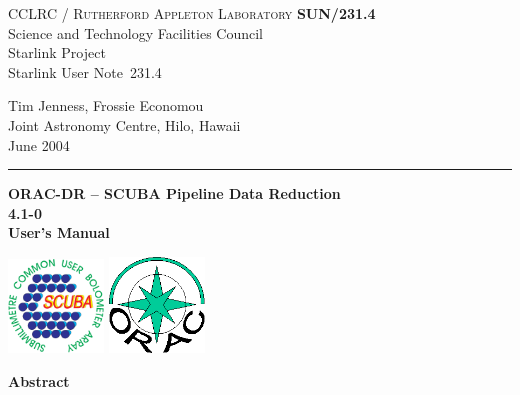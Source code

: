 \documentclass[twoside,11pt]{article}
\newcommand{\stardoccategory}  {Starlink User Note}
\newcommand{\stardocinitials}  {SUN}
\newcommand{\stardocnumber}    {231.4}
\newcommand{\stardocauthors}   {Tim Jenness, Frossie Economou\\
Joint Astronomy Centre, Hilo, Hawaii}
\newcommand{\stardocdate}      {June 2004}
\newcommand{\stardoctitle}     {ORAC-DR -- SCUBA Pipeline Data Reduction}
\newcommand{\stardocversion}   {4.1-0}
\newcommand{\stardocmanual}    {User's Manual}
\newcommand{\stardocname}{\stardocinitials /\stardocnumber}
\newenvironment{latexonly}{}{}
\renewcommand{\_}{\texttt{\symbol{95}}}
\begin{document}
\thispagestyle{empty}

\begin{latexonly}
   CCLRC / \textsc{Rutherford Appleton Laboratory} \hfill \textbf{\stardocname}\\
   {\large Science and Technology Facilities Council}\\
   {\large Starlink Project\\}
   {\large \stardoccategory\ \stardocnumber}
   \begin{flushright}
   \stardocauthors\\
   \stardocdate
   \end{flushright}
   \vspace{-4mm}
   \rule{\textwidth}{0.5mm}
   \vspace{5mm}
   \begin{center}
   {\Huge\textbf{\stardoctitle \\ [2.5ex]}}
   {\LARGE\textbf{\stardocversion \\ [4ex]}}
   {\Huge\textbf{\stardocmanual}}
   \end{center}
   \vspace{5mm}

\begin{center}
\includegraphics[width=1.0in]{sun231_sculogo}
\hskip 1.0in
\includegraphics[width=1.0in]{sun231_logo}
\end{center}

   \vspace{10mm}
   \begin{center}
      {\Large\textbf{Abstract}}
   \end{center}
\end{latexonly}
\end{document}
